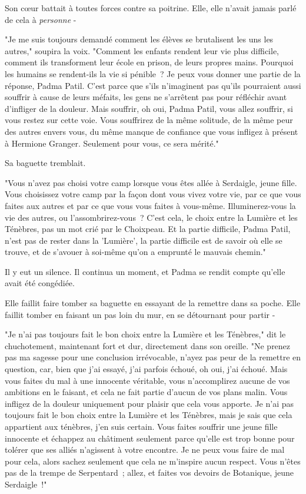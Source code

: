 Son cœur battait à toutes forces contre sa poitrine. Elle, elle n'avait jamais parlé de cela à \emph{personne} -

"Je me suis toujours demandé comment les élèves se brutalisent les uns les autres," soupira la voix. "Comment les enfants rendent leur vie plus difficile, comment ils transforment leur école en prison, de leurs propres mains. Pourquoi les humains se rendent-ils la vie si pénible~? Je peux vous donner une partie de la réponse, Padma Patil. C'est parce que s'ils n'imaginent pas qu'ils pourraient aussi souffrir à cause de leurs méfaits, les gens ne s'arrêtent pas pour réfléchir avant d'infliger de la douleur. Mais souffrir, oh oui, Padma Patil, vous allez souffrir, si vous restez sur cette voie. Vous souffrirez de la même solitude, de la même peur des autres envers vous, du même manque de confiance que vous infligez à présent à Hermione Granger. Seulement pour vous, ce sera mérité."

Sa baguette tremblait.

"Vous n'avez pas choisi votre camp lorsque vous êtes allée à Serdaigle, jeune fille. Vous choisissez votre camp par la façon dont vous vivez votre vie, par ce que vous faites aux autres et par ce que vous vous faites à vous-même. Illuminerez-vous la vie des autres, ou l'assombrirez-vous~? C'est cela, le choix entre la Lumière et les Ténèbres, pas un mot crié par le Choixpeau. Et la partie difficile, Padma Patil, n'est pas de rester dans la 'Lumière', la partie difficile est de savoir où elle se trouve, et de s'avouer à soi-même qu'on a emprunté le mauvais chemin."

Il y eut un silence. Il continua un moment, et Padma se rendit compte qu'elle avait été congédiée.

Elle faillit faire tomber sa baguette en essayant de la remettre dans sa poche. Elle faillit tomber en faisant un pas loin du mur, en se détournant pour partir -

"Je n'ai pas toujours fait le bon choix entre la Lumière et les Ténèbres," dit le chuchotement, maintenant fort et dur, directement dans son oreille. "Ne prenez pas ma sagesse pour une conclusion irrévocable, n'ayez pas peur de la remettre en question, car, bien que j'ai essayé, j'ai parfois échoué, oh oui, j'ai échoué. Mais vous faites du mal à une innocente véritable, vous n'accomplirez aucune de vos ambitions en le faisant, et cela ne fait partie d'aucun de vos plans malin. Vous infligez de la douleur uniquement pour plaisir que cela vous apporte. Je n'ai pas toujours fait le bon choix entre la Lumière et les Ténèbres, mais je sais que cela appartient aux ténèbres, j'en suis certain. Vous faites souffrir une jeune fille innocente et échappez au châtiment seulement parce qu'elle est trop bonne pour tolérer que ses alliés n'agissent à votre encontre. Je ne peux vous faire de mal pour cela, alors sachez seulement que cela ne m'inspire aucun respect. Vous n'êtes pas de la trempe de Serpentard~; allez, et faites vos devoirs de Botanique, jeune Serdaigle~!"

